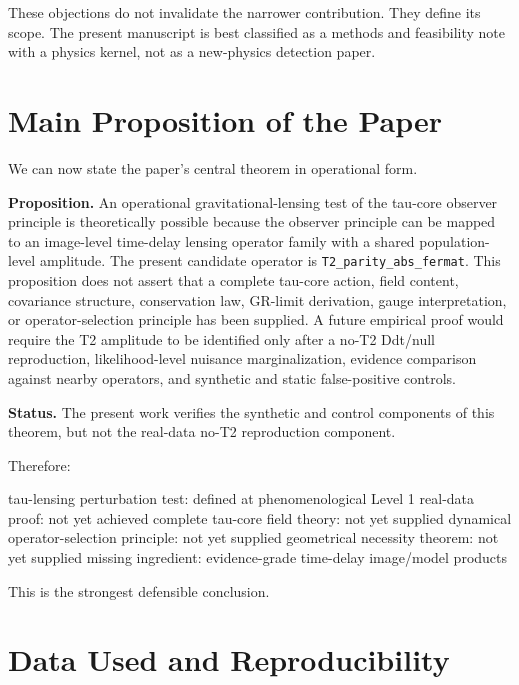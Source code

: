 \documentclass[11pt]{article}
\newenvironment{Shaded}{}{}
\newcommand{\NormalTok}[1]{#1}
\begin{document}
These objections do not invalidate the narrower contribution. They
define its scope. The present manuscript is best classified as a methods
and feasibility note with a physics kernel, not as a new-physics
detection paper.

\section{Main Proposition of the
Paper}\label{main-proposition-of-the-paper}

We can now state the paper's central theorem in operational form.

\textbf{Proposition.} An operational gravitational-lensing test of the
tau-core observer principle is theoretically possible because the
observer principle can be mapped to an image-level time-delay lensing
operator family with a shared population-level amplitude. The present
candidate operator is \texttt{T2\_parity\_abs\_fermat}. This proposition
does not assert that a complete tau-core action, field content,
covariance structure, conservation law, GR-limit derivation, gauge
interpretation, or operator-selection principle has been supplied. A
future empirical proof would require the T2 amplitude to be identified
only after a no-T2 Ddt/null reproduction, likelihood-level nuisance
marginalization, evidence comparison against nearby operators, and
synthetic and static false-positive controls.

\textbf{Status.} The present work verifies the synthetic and control
components of this theorem, but not the real-data no-T2 reproduction
component.

Therefore:

\begin{Shaded}
\begin{Highlighting}[]
\NormalTok{tau{-}lensing perturbation test: defined at phenomenological Level 1}
\NormalTok{real{-}data proof: not yet achieved}
\NormalTok{complete tau{-}core field theory: not yet supplied}
\NormalTok{dynamical operator{-}selection principle: not yet supplied}
\NormalTok{geometrical necessity theorem: not yet supplied}
\NormalTok{missing ingredient: evidence{-}grade time{-}delay image/model products}
\end{Highlighting}
\end{Shaded}

This is the strongest defensible conclusion.

\section{Data Used and
Reproducibility}\label{data-used-and-reproducibility}
\end{document}
